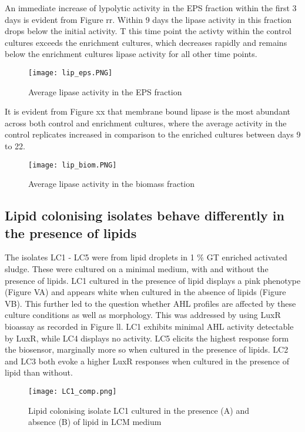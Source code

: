 \documentclass{article}
\begin{document}
An immediate increase of lypolytic activity in the EPS  fraction within the first 3 days is evident from Figure rr. Within 9 days the lipase activity in this fraction drops below the initial activity. T this time point the activty within the control cultures exceeds the enrichment cultures, which decreases rapidly and remains below the enrichment cultures lipase activity for all other time points.

\begin{figure}
\texttt{[image: lip\_eps.PNG]}
\caption{Average lipase activity in the EPS fraction}
\end{figure}

It is evident from  Figure xx that membrane bound lipase is the most abundant across both control and enrichment cultures, where the average activity in the control replicates increased in comparison to the enriched cultures between days 9 to 22.

\begin{figure}
\texttt{[image: lip\_biom.PNG]}
\caption{Average lipase activity in the biomass fraction}
\end{figure}

\subsection{Lipid colonising isolates behave differently in the presence of lipids}

The isolates LC1 - LC5 were from lipid droplets in 1 \% GT enriched activated sludge. These were cultured on a minimal medium, with and without the presence of lipids. LC1 cultured in the presence of lipid displays a pink phenotype (Figure VA) and appears white when cultured in the absence of lipids (Figure VB).
This further led to the question whether AHL profiles are affected by these culture conditions as well as morphology. This was addressed by using LuxR bioassay as recorded in Figure ll. LC1 exhibits minimal AHL activity detectable by LuxR, while LC4 displays no activity. LC5 elicits the highest response form the biosensor, marginally more so when cultured in the presence of lipids. LC2 and LC3 both evoke a higher LuxR responses when cultured in the presence of lipid than without.

\begin{figure}
\texttt{[image: LC1\_comp.png]}
\caption{Lipid colonising isolate LC1 cultured in the presence (A) and absence (B) of lipid in LCM medium}
\end{figure}
\end{document}

